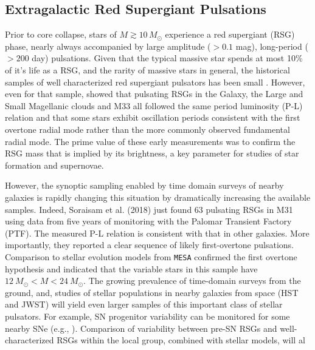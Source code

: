{\color{green}
\subsection{Extragalactic Red Supergiant Pulsations}
}


Prior to core collapse, stars of $M \! \gtrsim \! 10 \, M_\odot$ experience a red
supergiant (RSG) phase, nearly always accompanied by large amplitude
($>0.1$ mag), long-period ($>200 $ day) pulsations.  Given that the
typical massive star spends at most 10$\%$ of it's life as a RSG, and
the rarity of massive stars in general, the historical samples of well
characterized red supergiant pulsators has been small \citep[see][for a nice compilation]{Yang_2012}. However, even for that sample, \citet{Yang_2012} showed that pulsating RSGs in the Galaxy, the Large and Small Magellanic clouds and M33 all followed the
same period luminosity (P-L) relation and that some stars exhibit
oscillation periods consistent with the first overtone radial mode
rather than the more commonly observed fundamental radial mode. The
prime value of these early measurements was to confirm the RSG mass
that is implied by its brightness, a key parameter for studies of star
formation and supernovae. 

However, the synoptic sampling enabled by time domain surveys of
nearby galaxies is rapidly changing this situation by dramatically
increasing the available samples. Indeed, Soraisam et al. (2018) just
found 63 pulsating RSGs in M31 using data from five years of
monitoring with the Palomar Transient Factory (PTF). The measured P-L
relation is consistent with that in other galaxies. More importantly,
they reported a clear sequence of likely first-overtone
pulsations. Comparison to stellar evolution models from \texttt{MESA}
confirmed the first overtone hypothesis and indicated that the
variable stars in this sample have $12~M_{\odot} \! < \! M \! < \! 24~M_{\odot}$. The growing prevalence of time-domain surveys from the ground, and, studies 
of stellar populations in nearby galaxies from space (HST and JWST) 
will yield even larger samples of this important class of stellar pulsators. For example, SN progenitor variability can be monitored for some nearby SNe (e.g., \citealt{kochanek:17}). Comparison of variability between pre-SN RSGs and well-characterized RSGs within the local group, combined with stellar models, will al